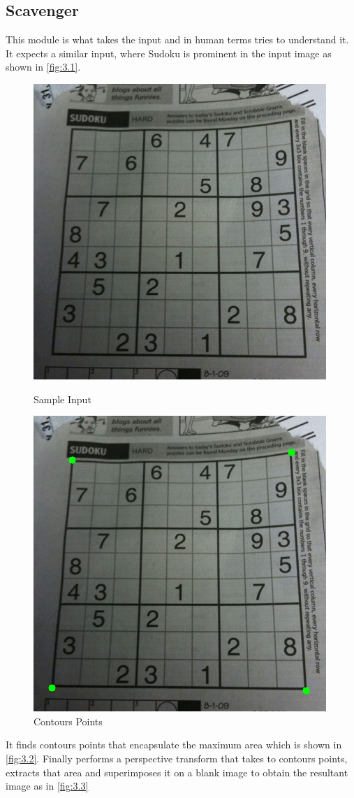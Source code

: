\documentclass[twocolumn, switch]{article} %
\begin{document}
\subsection{Scavenger}
\label{sub:sec:scavenger}
This module is what takes the input and in human terms tries to understand it. It expects a similar input, where Sudoku is prominent in the input image as shown in \eqref{fig:3.1}.

\begin{figure}[!htbp]
    \centering
    \begin{minipage}{0.24\textwidth}
        \centering
        \includegraphics[height=0.5\textwidth]{sample_puzzle.jpg}
        \caption[Sample Input]{\centering Sample Input}
        \label{fig:3.3}
    \end{minipage}\hfill
    \begin{minipage}{0.24\textwidth}
        \centering
        \includegraphics[height=0.5\textwidth]{corners.jpg}
        \caption[Sample Input]{\centering Contours Points}
        \label{fig:3.4}
    \end{minipage}
\end{figure}

It finds contours points that encapsulate the maximum area which is shown in \eqref{fig:3.2}. Finally performs a perspective transform that takes to contours points, extracts that area and superimposes it on a blank image to obtain the resultant image as in \eqref{fig:3.3}
\end{document}
